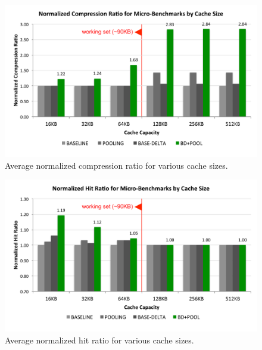 \documentclass[pageno]{jpaper}
\begin{document}
\begin{figure}
  \centering
    \includegraphics[width=\linewidth]{size2compression.pdf}
  \caption{Average normalized compression ratio for various cache sizes.}
\end{figure}

\begin{figure}
  \centering
    \includegraphics[width=\linewidth]{size2hits.pdf}
  \caption{Average normalized hit ratio for various cache sizes.}
\end{figure}



\end{document}
